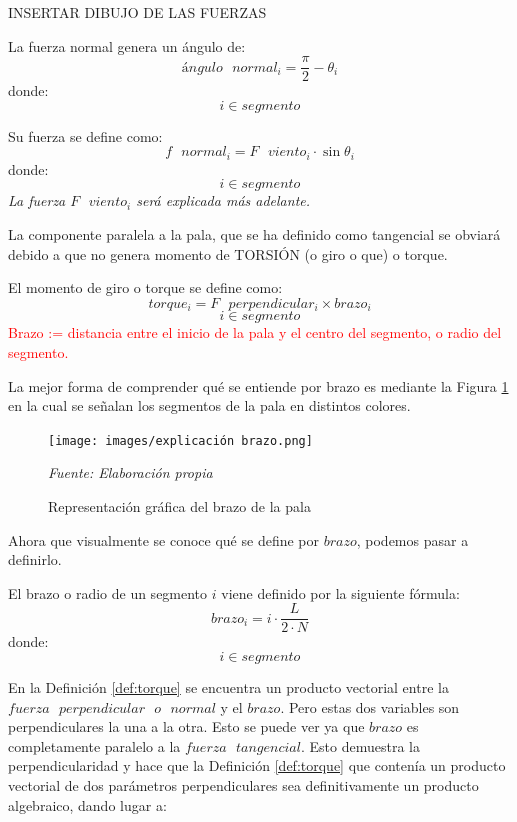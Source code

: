  INSERTAR DIBUJO DE LAS FUERZAS \\
 
 \begin{definicion}
 La fuerza normal genera un ángulo de:
 $$ ángulo \text{ } normal_i = \dfrac{\pi}{2} - \theta_i $$
 donde:
 $$ i \in segmento$$
 \end{definicion}

 \begin{definicion}
  Su fuerza se define como:
  $$ f \text{ } normal_i = F \text{ } viento_i \cdot \sin{\theta_i}$$
   donde:
 $$ i \in segmento$$
   \textit{La fuerza $F \text{ } viento_i$ será explicada más adelante.}
  \label{def:fuerza_normal}
 \end{definicion}

 
 La componente paralela a la pala, que se ha definido como tangencial se obviará debido a que no genera momento de TORSIÓN (o giro o que) o torque. 
 
 
 
 \begin{definicion}
El momento de giro o torque se define como:
 $$ torque_i = F \text{ } perpendicular_i \times brazo_i$$
 $$ i \in segmento$$
 \label{def:torque} %
 \textcolor{red}{Brazo := distancia entre el inicio de la pala y el centro del segmento, o radio del segmento.} \\
 \end{definicion}

 La mejor forma de comprender qué se entiende por brazo es mediante la Figura \ref{fig:exp_brazo} en la cual se señalan los segmentos de la pala en distintos colores.
 
     \textbf{}
    \begin{figure}[H]
    \centering
    \texttt{[image: images/explicación brazo.png]}
    \caption{Representación gráfica del brazo de la pala}
    \label{fig:exp_brazo}
    \textit{Fuente: Elaboración propia}
\end{figure}

Ahora que visualmente se conoce qué se define por $brazo$, podemos pasar a definirlo.

\begin{definicion}
El  brazo o radio de un segmento $i$ viene definido por la siguiente fórmula:
$$ brazo_i  =  i \cdot \dfrac{L}{2 \cdot N}$$
    donde:
 $$ i \in segmento$$

\end{definicion}

 
 En la Definición \ref{def:torque} se encuentra un producto vectorial entre la $fuerza  \text{ }perpendicular \text{ } o \text{ } normal$ y el $brazo$. Pero estas dos variables son perpendiculares la una a la otra. Esto se puede ver ya que $brazo$ es completamente paralelo a la $fuerza \text{ } tangencial$. Esto demuestra la perpendicularidad y hace que la Definición \ref{def:torque} que contenía un producto vectorial de dos parámetros perpendiculares sea definitivamente un producto algebraico, dando lugar a:
 
